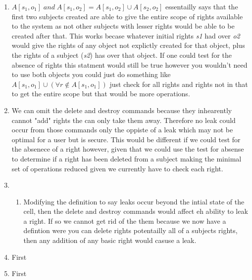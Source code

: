 \documentclass[journal,onecolumn]{IEEEtran}
\begin{document}
\begin{enumerate}
  \item \(A[s_1,o_1] \; and \; A[s_1,o_2] = A[s_1,o_2] \cup A[s_2,o_2]\) essentailly says that the first two subjects created are able to give the entire scope of rights available to the system as not other subjects with lesser rights would be able to be created after that. This works becase whatever initial rights \textit{s1} had over \textit{o2} would give the rights of any object not explictly created for that object, plus the rights of a subject (\textit{s2}) has over that object.
  If one could test for the absence of rights this statment would still be true however you wouldn't need to use both objects you could just do something like \(A[s_1,o_1] \cup (\forall r \not\in A[s_1,o_1])\) just check for all rights and rights not in that to get the entire scope but that would be more operations.
  \item We can omit the delete and destroy commands because they inhearently cannot "add" rights the can only take them away. Therefore no leak could occur from those commands only the oppiste of a leak which may not be optimal for a user but is secure. This would be different if we could test for the absenece of a right however, given that we could use the test for absense to determine if a right has been deleted from a subject making the minimal set of operations reduced given we currently have to check each right. 
  \item 
  \begin{enumerate}
    \item Modifying the definition to say leaks occur beyond the intial state of the cell, then the delete and destroy commands would affect eh ability to leak a right. If so we cannot get rid of the them because we now have a defintion were you can delete rights potentailly all of a subjects rights, then any addition of any basic right would casuse a leak. 
  \end{enumerate}
  \item First
  \item First
\end{enumerate}


\end{document}

